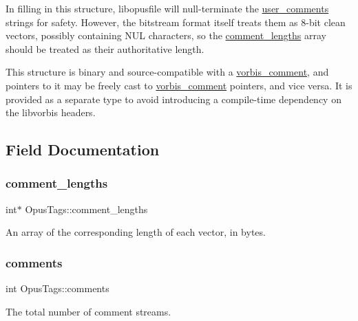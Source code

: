 In filling in this structure, {\ttfamily libopusfile} will null-\/terminate the \hyperlink{struct_opus_tags_ad53d571bd8b23691089242e4e161358a}{user\+\_\+comments} strings for safety. However, the bitstream format itself treats them as 8-\/bit clean vectors, possibly containing N\+UL characters, so the \hyperlink{struct_opus_tags_aa99547abb03d7dbe0cd7095d8b706170}{comment\+\_\+lengths} array should be treated as their authoritative length.

This structure is binary and source-\/compatible with a {\ttfamily \hyperlink{structvorbis__comment}{vorbis\+\_\+comment}}, and pointers to it may be freely cast to {\ttfamily \hyperlink{structvorbis__comment}{vorbis\+\_\+comment}} pointers, and vice versa. It is provided as a separate type to avoid introducing a compile-\/time dependency on the libvorbis headers. 

\subsection{Field Documentation}
\mbox{\label{struct_opus_tags_aa99547abb03d7dbe0cd7095d8b706170}} 
\subsubsection{\texorpdfstring{comment\+\_\+lengths}{comment\_lengths}}
{\footnotesize\ttfamily int$\ast$ Opus\+Tags\+::comment\+\_\+lengths}

An array of the corresponding length of each vector, in bytes. \mbox{\label{struct_opus_tags_a65c37166930a1f5d682fa6c863fc28c6}} 
\subsubsection{\texorpdfstring{comments}{comments}}
{\footnotesize\ttfamily int Opus\+Tags\+::comments}

The total number of comment streams. \mbox{\label{struct_opus_tags_ad53d571bd8b23691089242e4e161358a}} 
